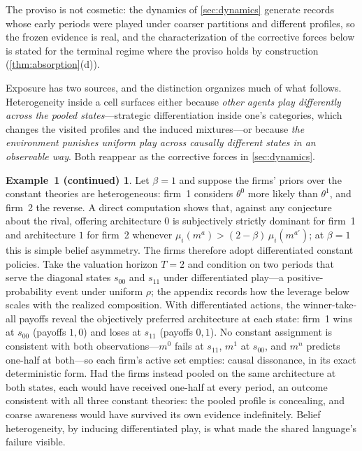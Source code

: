 \documentclass[11pt]{article}
\theoremstyle{definition}
\newtheorem*{excont}{Example~1 (continued)}
\begin{document}
The proviso is not cosmetic: the dynamics of \cref{sec:dynamics} generate records whose early periods were played under coarser partitions and different profiles, so the frozen evidence is real, and the characterization of the corrective forces below is stated for the terminal regime where the proviso holds by construction (\cref{thm:absorption}(d)).

Exposure has two sources, and the distinction organizes much of what follows.
Heterogeneity inside a cell surfaces either because \emph{other agents play differently across the pooled states}---strategic differentiation inside one's categories, which changes the visited profiles and the induced mixtures---or because \emph{the environment punishes uniform play across causally different states in an observable way}.
Both reappear as the corrective forces in \cref{sec:dynamics}.

\begin{excont}
Let $\beta=1$ and suppose the firms' priors over the constant theories are heterogeneous: firm~1 considers $\theta^0$ more likely than $\theta^1$, and firm~2 the reverse.
A direct computation shows that, against any conjecture about the rival, offering architecture $0$ is subjectively strictly dominant for firm~1 and architecture $1$ for firm~2 whenever $\mu_i(m^a)>(2-\beta)\,\mu_i(m^{a'})$; at $\beta=1$ this is simple belief asymmetry.
The firms therefore adopt differentiated constant policies.
Take the valuation horizon $T=2$ and condition on two periods that serve the diagonal states $s_{00}$ and $s_{11}$ under differentiated play---a positive-probability event under uniform $\rho$; the appendix records how the leverage below scales with the realized composition.
With differentiated actions, the winner-take-all payoffs reveal the objectively preferred architecture at each state: firm~1 wins at $s_{00}$ (payoffs $1,0$) and loses at $s_{11}$ (payoffs $0,1$).
No constant assignment is consistent with both observations---$m^0$ fails at $s_{11}$, $m^1$ at $s_{00}$, and $m^n$ predicts one-half at both---so each firm's active set empties: causal dissonance, in its exact deterministic form.
Had the firms instead pooled on the same architecture at both states, each would have received one-half at every period, an outcome consistent with all three constant theories: the pooled profile is concealing, and coarse awareness would have survived its own evidence indefinitely.
Belief heterogeneity, by inducing differentiated play, is what made the shared language's failure visible.
\end{excont}
\end{document}
